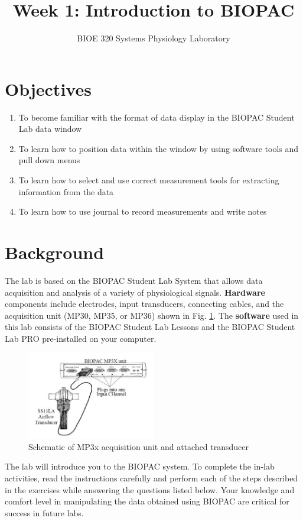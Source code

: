 \documentclass{article}
\title{Week 1: Introduction to BIOPAC}
\author{BIOE 320 Systems Physiology Laboratory}
\date{}
\begin{document}
\large
\maketitle

\section*{Objectives}
\begin{enumerate}
	\item To become familiar with the format of data display in the BIOPAC Student Lab data window
	\item To learn how to position data within the window by using software tools and pull down menus
	\item To learn how to select and use correct measurement tools for extracting information from the data
	\item To learn how to use journal to record measurements and write notes
\end{enumerate}

\section*{Background}
The lab is based on the BIOPAC Student Lab System that allows data acquisition and analysis of a variety of physiological signals. \textbf{Hardware} components include electrodes, input transducers, connecting cables, and the acquisition unit (MP30, MP35, or MP36) shown in Fig. \ref{basic_scheme}. The \textbf{software} used in this lab consists of the BIOPAC Student Lab Lessons and the BIOPAC Student Lab PRO pre-installed on your computer.

\begin{figure}[h]
\includegraphics[width=0.5\textwidth]{../images/BIOPAC_1.jpg}
\centering
\caption{Schematic of MP3x acquisition unit and attached transducer}
\label{basic_scheme}
\end{figure}

The lab will introduce you to the BIOPAC system. To complete the in-lab activities, read the instructions carefully and perform each of the steps described in the exercises while answering the questions listed below. Your knowledge and comfort level in manipulating the data obtained using BIOPAC are critical for success in future labs.
\end{document}
